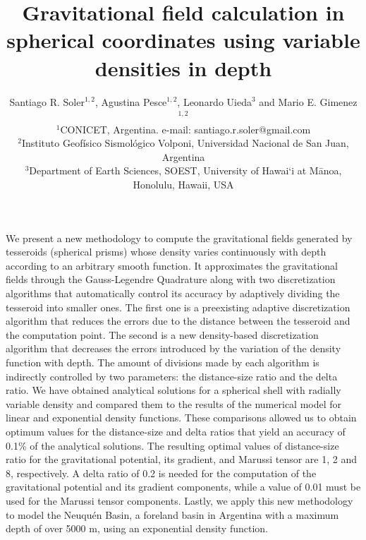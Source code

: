 \documentclass[extra, referee]{gji}
\begin{document}
\title[Variable Density Tesseroids]{
    Gravitational field calculation in spherical coordinates using variable
    densities in depth
}
\author[S.R. Soler, A. Pesce, L. Uieda and M.E. Gimenez]{
    Santiago R. Soler$^{1,2}$, Agustina Pesce$^{1,2}$, Leonardo Uieda$^3$ and
    Mario E. Gimenez$^{1,2}$ \\
    $^1$CONICET, Argentina. e-mail: santiago.r.soler@gmail.com\\
    $^2$Instituto Geofísico Sismológico Volponi, Universidad Nacional de
    San Juan, Argentina\\
    $^3$Department of Earth Sciences, SOEST, University of Hawai‘i at
    M\={a}noa, Honolulu, Hawaii, USA
}


\maketitle

\begin{summary}
We present a new methodology to compute the gravitational fields generated by
tesseroids (spherical prisms) whose density varies continuously with depth according to
an arbitrary smooth function.
It approximates the gravitational fields through the Gauss-Legendre Quadrature along
with two discretization algorithms that automatically control its accuracy by adaptively
dividing the tesseroid into smaller ones.
The first one is a preexisting adaptive discretization algorithm that reduces
the errors due to the distance between the tesseroid and the computation
point.
The second is a new density-based discretization algorithm that
decreases the errors introduced by the variation of the density function with depth.
The amount of divisions made by each algorithm is indirectly controlled
by two parameters: the distance-size ratio and the delta ratio.
We have obtained analytical solutions for a spherical shell with radially variable
density and compared them to the results of the numerical model for linear and
exponential density functions.
These comparisons allowed us to obtain optimum values for the distance-size and
delta ratios that yield an accuracy of 0.1\% of the analytical solutions.
The resulting optimal values of distance-size ratio for the gravitational potential, its
gradient, and Marussi tensor are 1, 2 and 8, respectively.
A delta ratio of 0.2 is needed for the computation of the gravitational potential and
its gradient components, while a value of 0.01 must be used for the Marussi tensor
components.
Lastly, we apply this new methodology to model the Neuqu\'en Basin, a foreland basin in
Argentina with a maximum depth of over 5000 m, using an exponential density function.
\end{summary}
\end{document}
